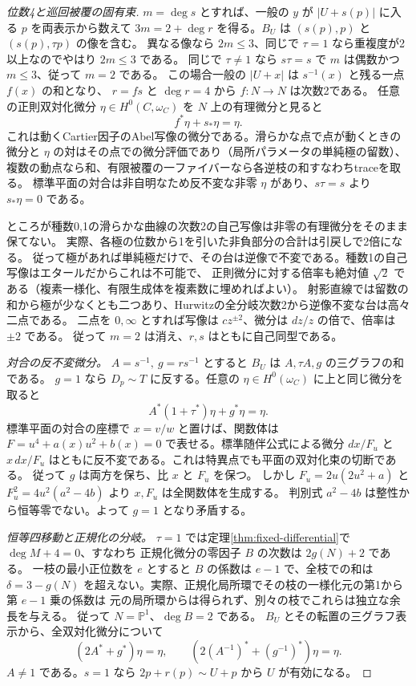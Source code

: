 \begin{proof}[位数4と巡回被覆の固有束]
$m=\deg s$ とすれば、一般の $y$ が $|U+s(p)|$ に入る $p$ を両表示から数えて
$3m=2+\deg r$ を得る。$B_U$ は $(s(p),p)$ と $(s(p),\tau p)$ の像を含む。
異なる像なら $2m\le3$、同じで $\tau=1$ なら重複度が2以上なのでやはり $2m\le3$ である。
同じで $\tau\ne1$ なら $s\tau=s$ で $m$ は偶数かつ $m\le3$、従って $m=2$ である。
この場合一般の $|U+x|$ は $s^{-1}(x)$ と残る一点 $f(x)$ の和となり、
$r=fs$ と $\deg r=4$ から $f:N\to N$ は次数2である。
任意の正則双対化微分 $\eta\in H^0(C,\omega_C)$ を $N$ 上の有理微分と見ると
\[
                            f^*\eta+s_*\eta=\eta .
\]
これは動くCartier因子のAbel写像の微分である。滑らかな点で点が動くときの微分と
$\eta$ の対はその点での微分評価であり（局所パラメータの単純極の留数）、
複数の動点なら和、有限被覆の一ファイバーなら各逆枝の和すなわちtraceを取る。
標準平面の対合は非自明なため反不変な非零 $\eta$ があり、$s\tau=s$ より $s_*\eta=0$ である。

ところが種数0,1の滑らかな曲線の次数2の自己写像は非零の有理微分をそのまま保てない。
実際、各極の位数から1を引いた非負部分の合計は引戻しで2倍になる。
従って極があれば単純極だけで、その台は逆像で不変である。種数1の自己写像はエタールだからこれは不可能で、
正則微分に対する倍率も絶対値 $\sqrt2$ である（複素一様化、有限生成体を複素数に埋めればよい）。
射影直線では留数の和から極が少なくとも二つあり、Hurwitzの全分岐次数2から逆像不変な台は高々二点である。
二点を $0,\infty$ とすれば写像は $cz^{\pm2}$、微分は $dz/z$ の倍で、倍率は $\pm2$ である。
従って $m=2$ は消え、$r,s$ はともに自己同型である。

\smallskip
\noindent\textit{対合の反不変微分。}
$A=s^{-1},\ g=rs^{-1}$ とすると $B_U$ は $A,\tau A,g$ の三グラフの和である。
$g=1$ なら $D_p\sim T$ に反する。任意の $\eta\in H^0(\omega_C)$ に上と同じ微分を取ると
\[
             A^*(1+\tau^*)\eta+g^*\eta=\eta .
\]
標準平面の対合の座標で $x=v/w$ と置けば、関数体は
$F=u^4+a(x)u^2+b(x)=0$ で表せる。標準随伴公式による微分 $dx/F_u$ と
$x\,dx/F_u$ はともに反不変である。これは特異点でも平面の双対化束の切断である。
従って $g$ は両方を保ち、比 $x$ と $F_u$ を保つ。
しかし $F_u=2u(2u^2+a)$ と $F_u^2=4u^2(a^2-4b)$ より $x,F_u$ は全関数体を生成する。
判別式 $a^2-4b$ は整性から恒等零でない。よって $g=1$ となり矛盾する。

\smallskip
\noindent\textit{恒等四移動と正規化の分岐。}
$\tau=1$ では定理\ref{thm:fixed-differential}で $\deg M+4=0$、すなわち
正規化微分の零因子 $B$ の次数は $2g(N)+2$ である。
一枝の最小正位数を $e$ とすると $B$ の係数は $e-1$ で、全枝での和は
$\delta=3-g(N)$ を超えない。実際、正規化局所環でその枝の一様化元の第1から第 $e-1$ 乗の係数は
元の局所環からは得られず、別々の枝でこれらは独立な余長を与える。
従って $N=\mathbb P^1$、$\deg B=2$ である。
$B_U$ とその転置の三グラフ表示から、全双対化微分について
\[
      (2A^*+g^*)\eta=\eta,\qquad
      (2(A^{-1})^*+(g^{-1})^*)\eta=\eta .
\]
$A\ne1$ である。$s=1$ なら $2p+r(p)\sim U+p$ から $U$ が有効になる。


\end{proof}
